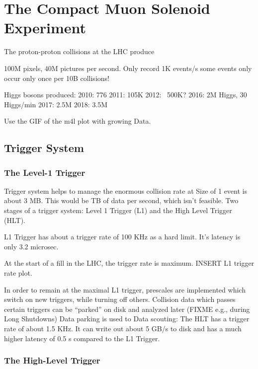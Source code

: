 \chapter{The Compact Muon Solenoid Experiment}
\label{ch:cms}

The proton-proton collisions at the LHC produce 


100M pixels, 40M pictures per second. Only record 1K events/s some events only occur only once per 10B collisions!

Higgs bosons produced:
2010: 776
2011: 105K
2012: ~500K?
2016: 2M Higgs, 30 Higgs/min
2017: 2.5M 
2018: 3.5M

Use the GIF of the m4l plot with growing Data.


\section{Trigger System}
\label{sec:trigger}

\subsection{The Level-1 Trigger}
\label{sec:L1_trig}

Trigger system helps to manage the enormous collision rate at 
Size of 1 event is about 3 MB.
This would be TB of data per second, which isn't feasible.
Two stages of a trigger system: Level 1 Trigger (L1) and the High Level Trigger (HLT).

L1 Trigger has about a trigger rate of 100 KHz as a hard limit.
It's latency is only 3.2 microsec.

At the start of a fill in the LHC, the trigger rate is maximum.
INSERT L1 trigger rate plot.

In order to remain at the maximal L1 trigger, prescales are implemented which switch on new triggers, while turning off others.
Collision data which passes certain triggers can be ``parked'' on disk and analyzed later (FIXME e.g., during Long Shutdowns)  Data parking is used to 
Data scouting: 
The HLT has a trigger rate of about 1.5 KHz.
It can write out about 5 GB/s to disk and has a much higher latency of 0.5 s compared to the L1 Trigger.



\subsection{The High-Level Trigger}
\label{sec:hlt}
